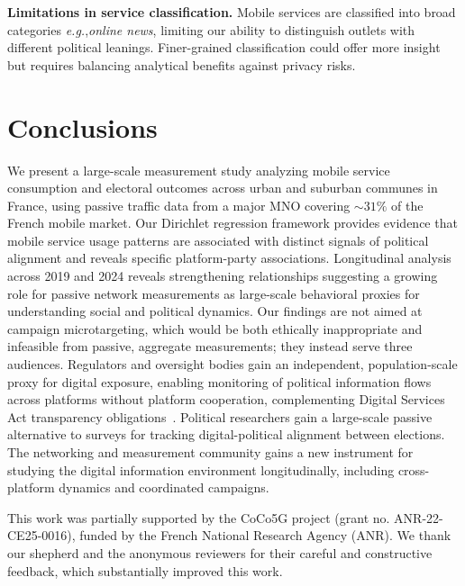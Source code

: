 \documentclass[9pt,sigconf,letterpaper]{acmart}
\newcommand{\eg}{\textit{e.g.},\xspace}
\begin{document}
\noindent\textbf{Limitations in service classification.}
Mobile services are classified into broad categories \eg \textit{online news}, limiting our ability to distinguish outlets with different political leanings.
Finer-grained classification could offer more insight but requires balancing analytical benefits against privacy risks.

\section{Conclusions}
We present a large-scale measurement study analyzing mobile service consumption and electoral outcomes across urban and suburban communes in France, using passive traffic data from a major \ac{MNO} covering ${\sim}31\%$ of the French mobile market.
Our Dirichlet regression framework provides evidence that mobile service usage patterns are associated with distinct signals of political alignment and reveals specific platform-party associations.
Longitudinal analysis across 2019 and 2024 reveals strengthening relationships suggesting a growing role for passive network measurements as large-scale behavioral proxies for understanding social and political dynamics.
Our findings are not aimed at campaign microtargeting, which would be both ethically inappropriate and infeasible from passive, aggregate measurements; they instead serve three audiences.
Regulators and oversight bodies gain an independent, population-scale proxy for digital exposure, enabling monitoring of political information flows across platforms without platform cooperation, complementing Digital Services Act transparency obligations~\cite{di2024sampled}.
Political researchers gain a large-scale passive alternative to surveys for tracking digital-political alignment between elections.
The networking and measurement community gains a new instrument for studying the digital information environment longitudinally, including cross-platform dynamics and coordinated campaigns.

\begin{acks}
This work was partially supported by the CoCo5G project (grant no. ANR-22-CE25-0016), funded by the French National Research Agency (ANR).
We thank our shepherd and the anonymous reviewers for their careful and constructive feedback, which substantially improved this work.
\end{acks}





\end{document}
